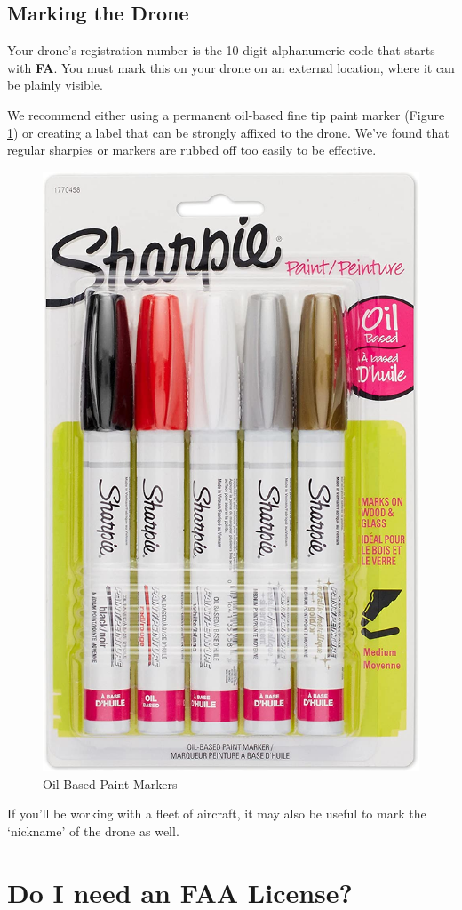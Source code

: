 \documentclass[
]{book}
\begin{document}
\hypertarget{marking-the-drone}{%
\section{Marking the Drone}\label{marking-the-drone}}

Your drone's registration number is the 10 digit alphanumeric code that starts with \textbf{FA}. You must mark this on your drone on an external location, where it can be plainly visible.

We recommend either using a permanent oil-based fine tip paint marker (Figure \ref{fig:markers}) or creating a label that can be strongly affixed to the drone. We've found that regular sharpies or markers are rubbed off too easily to be effective.

\begin{figure}

{\centering \includegraphics[width=0.5\linewidth]{images/oil-based-markers} 

}

\caption{Oil-Based Paint Markers}\label{fig:markers}
\end{figure}

If you'll be working with a fleet of aircraft, it may also be useful to mark the `nickname' of the drone as well.

\hypertarget{ch-license}{%
\chapter{Do I need an FAA License?}\label{ch-license}}
\end{document}
